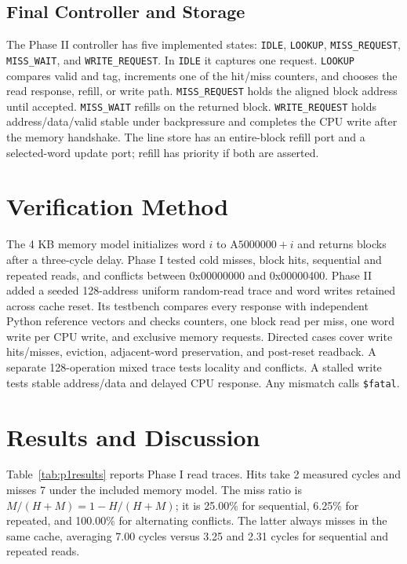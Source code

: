 \documentclass[conference]{IEEEtran}
\begin{document}
\subsection{Final Controller and Storage}
The Phase II controller has five implemented states: \texttt{IDLE}, \texttt{LOOKUP}, \texttt{MISS\_REQUEST}, \texttt{MISS\_WAIT}, and \texttt{WRITE\_REQUEST}. In \texttt{IDLE} it captures one request. \texttt{LOOKUP} compares valid and tag, increments one of the hit/miss counters, and chooses the read response, refill, or write path. \texttt{MISS\_REQUEST} holds the aligned block address until accepted. \texttt{MISS\_WAIT} refills on the returned block. \texttt{WRITE\_REQUEST} holds address/data/valid stable under backpressure and completes the CPU write after the memory handshake. The line store has an entire-block refill port and a selected-word update port; refill has priority if both are asserted.

\section{Verification Method}
The 4 KB memory model initializes word $i$ to $\mathrm{A5000000}+i$ and returns blocks after a three-cycle delay. Phase I tested cold misses, block hits, sequential and repeated reads, and conflicts between 0x00000000 and 0x00000400. Phase II added a seeded 128-address uniform random-read trace and word writes retained across cache reset. Its testbench compares every response with independent Python reference vectors and checks counters, one block read per miss, one word write per CPU write, and exclusive memory requests. Directed cases cover write hits/misses, eviction, adjacent-word preservation, and post-reset readback. A separate 128-operation mixed trace tests locality and conflicts. A stalled write tests stable address/data and delayed CPU response. Any mismatch calls \texttt{\$fatal}.

\section{Results and Discussion}
Table~\ref{tab:p1results} reports Phase I read traces. Hits take 2 measured cycles and misses 7 under the included memory model. The miss ratio is $M/(H+M)=1-H/(H+M)$; it is 25.00\% for sequential, 6.25\% for repeated, and 100.00\% for alternating conflicts. The latter always misses in the same cache, averaging 7.00 cycles versus 3.25 and 2.31 cycles for sequential and repeated reads.
\end{document}
